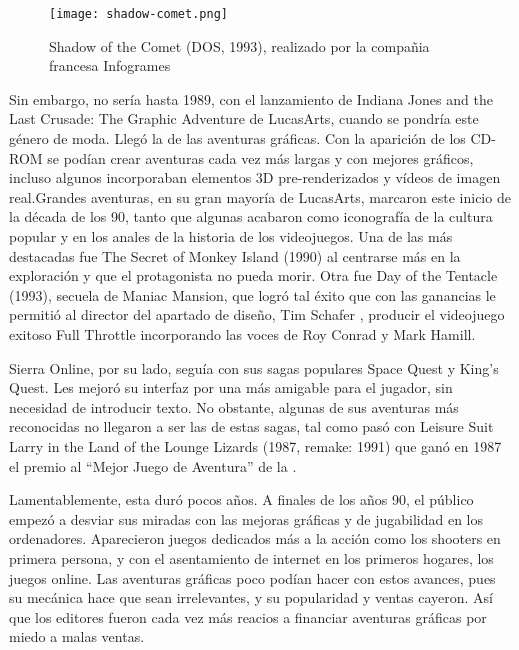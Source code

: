 \begin{figure}[H] 
  \begin{center}
    \texttt{[image: shadow-comet.png]}
  \end{center}
  \caption{Shadow of the Comet (DOS, 1993), realizado por la compañia francesa Infogrames}
    \label{fig:shadow-comet}
\end{figure}

Sin embargo, no sería hasta 1989, con el lanzamiento de Indiana Jones and the Last Crusade: The Graphic Adventure  de LucasArts, cuando se pondría este género de moda. Llegó la  de las aventuras gráficas. Con la aparición de los CD-ROM se podían crear aventuras cada vez más largas y con mejores gráficos, incluso algunos incorporaban elementos 3D pre-renderizados y vídeos de imagen real.Grandes aventuras, en su gran mayoría de LucasArts, marcaron este inicio de la década de los 90, tanto que algunas acabaron como iconografía de la cultura popular y en los anales de la historia de los videojuegos. Una de las más destacadas fue The Secret of Monkey Island  (1990) al centrarse más en la exploración y que el protagonista no pueda morir. Otra fue Day of the Tentacle  (1993), secuela de Maniac Mansion, que logró tal éxito que con las ganancias le permitió al director del apartado de diseño, Tim Schafer , producir el videojuego exitoso Full Throttle  incorporando las voces de Roy Conrad y Mark Hamill.

Sierra Online, por su lado, seguía con sus sagas populares Space Quest y King's Quest. Les mejoró su interfaz  por una más amigable para el jugador, sin necesidad de introducir texto. No obstante, algunas de sus aventuras más reconocidas no llegaron a ser las de estas sagas, tal como pasó con Leisure Suit Larry in the Land of the Lounge Lizards  (1987, remake: 1991) que ganó en 1987 el premio al ``Mejor Juego de Aventura'' de la .


Lamentablemente, esta  duró pocos años. A finales de los años 90, el público empezó a desviar sus miradas con las mejoras gráficas y de jugabilidad en los ordenadores. Aparecieron juegos dedicados más a la acción como los shooters en primera persona, y con el asentamiento de internet en los primeros hogares, los juegos online. Las aventuras gráficas poco podían hacer con estos avances, pues su mecánica hace que sean irrelevantes, y su popularidad y ventas cayeron. Así que los editores fueron cada vez más reacios a financiar aventuras gráficas por miedo a malas ventas.

